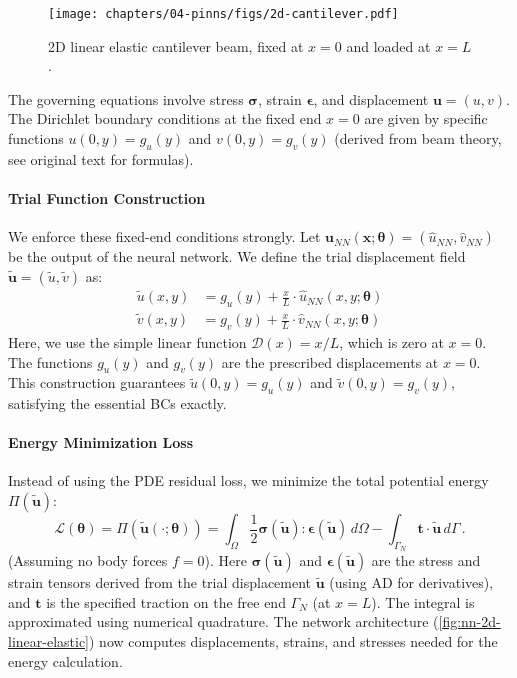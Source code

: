 \begin{figure}[htbp]
    \centering
    \texttt{[image: chapters/04-pinns/figs/2d-cantilever.pdf]}
    \caption{2D linear elastic cantilever beam, fixed at $x=0$ and loaded at $x=L$.}
    \label{fig:2d-cantilever}
\end{figure}

The governing equations involve stress $\boldsymbol{\sigma}$, strain $\boldsymbol{\epsilon}$, and displacement $\mathbf{u}=(u,v)$. The Dirichlet boundary conditions at the fixed end $x=0$ are given by specific functions $u(0,y) = g_u(y)$ and $v(0,y) = g_v(y)$ (derived from beam theory, see original text for formulas).

\paragraph{Trial Function Construction}
We enforce these fixed-end conditions strongly. Let $\mathbf{u}_{NN}(\mathbf{x}; \boldsymbol{\theta}) = (\hat{u}_{NN}, \hat{v}_{NN})$ be the output of the neural network. We define the trial displacement field $\tilde{\mathbf{u}} = (\tilde{u}, \tilde{v})$ as:
%
\begin{align*}
\tilde{u}(x,y) &= g_u(y) + \frac{x}{L} \cdot \hat{u}_{NN}(x,y; \boldsymbol{\theta}) \\
\tilde{v}(x,y) &= g_v(y) + \frac{x}{L} \cdot \hat{v}_{NN}(x,y; \boldsymbol{\theta})
\end{align*}
%
Here, we use the simple linear function $\mathcal{D}(x) = x/L$, which is zero at $x=0$. The functions $g_u(y)$ and $g_v(y)$ are the prescribed displacements at $x=0$. This construction guarantees $\tilde{u}(0,y) = g_u(y)$ and $\tilde{v}(0,y) = g_v(y)$, satisfying the essential BCs exactly.

\paragraph{Energy Minimization Loss}
Instead of using the PDE residual loss, we minimize the total potential energy $\Pi(\tilde{\mathbf{u}})$:
%
\begin{equation*}
\mathcal{L}(\boldsymbol{\theta}) = \Pi(\tilde{\mathbf{u}}(\cdot; \boldsymbol{\theta})) = \int_{\Omega} \frac{1}{2}\boldsymbol{\sigma}(\tilde{\mathbf{u}}) : \boldsymbol{\epsilon}(\tilde{\mathbf{u}}) \, d\Omega - \int_{\Gamma_N} \mathbf{t} \cdot \tilde{\mathbf{u}} \, d\Gamma\,.
\end{equation*}
%
(Assuming no body forces $f=0$). Here $\boldsymbol{\sigma}(\tilde{\mathbf{u}})$ and $\boldsymbol{\epsilon}(\tilde{\mathbf{u}})$ are the stress and strain tensors derived from the trial displacement $\tilde{\mathbf{u}}$ (using AD for derivatives), and $\mathbf{t}$ is the specified traction on the free end $\Gamma_N$ (at $x=L$). The integral is approximated using numerical quadrature. The network architecture (\cref{fig:nn-2d-linear-elastic}) now computes displacements, strains, and stresses needed for the energy calculation.

